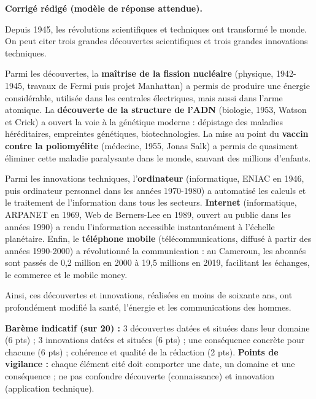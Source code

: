 \documentclass[11pt]{article}
\begin{document}
\begin{corrige}
\textbf{Corrigé rédigé (modèle de réponse attendue).}

Depuis 1945, les révolutions scientifiques et techniques ont transformé le monde. On peut citer trois grandes découvertes scientifiques et trois grandes innovations techniques.

Parmi les découvertes, la \textbf{maîtrise de la fission nucléaire} (physique, 1942-1945, travaux de Fermi puis projet Manhattan) a permis de produire une énergie considérable, utilisée dans les centrales électriques, mais aussi dans l'arme atomique. La \textbf{découverte de la structure de l'ADN} (biologie, 1953, Watson et Crick) a ouvert la voie à la génétique moderne : dépistage des maladies héréditaires, empreintes génétiques, biotechnologies. La mise au point du \textbf{vaccin contre la poliomyélite} (médecine, 1955, Jonas Salk) a permis de quasiment éliminer cette maladie paralysante dans le monde, sauvant des millions d'enfants.

Parmi les innovations techniques, l'\textbf{ordinateur} (informatique, ENIAC en 1946, puis ordinateur personnel dans les années 1970-1980) a automatisé les calculs et le traitement de l'information dans tous les secteurs. \textbf{Internet} (informatique, ARPANET en 1969, Web de Berners-Lee en 1989, ouvert au public dans les années 1990) a rendu l'information accessible instantanément à l'échelle planétaire. Enfin, le \textbf{téléphone mobile} (télécommunications, diffusé à partir des années 1990-2000) a révolutionné la communication : au Cameroun, les abonnés sont passés de 0,2 million en 2000 à 19,5 millions en 2019, facilitant les échanges, le commerce et le mobile money.

Ainsi, ces découvertes et innovations, réalisées en moins de soixante ans, ont profondément modifié la santé, l'énergie et les communications des hommes.

\textbf{Barème indicatif (sur 20) :} 3 découvertes datées et situées dans leur domaine (6 pts) ; 3 innovations datées et situées (6 pts) ; une conséquence concrète pour chacune (6 pts) ; cohérence et qualité de la rédaction (2 pts).
\textbf{Points de vigilance :} chaque élément cité doit comporter une date, un domaine et une conséquence ; ne pas confondre découverte (connaissance) et innovation (application technique).
\end{corrige}
\end{document}
